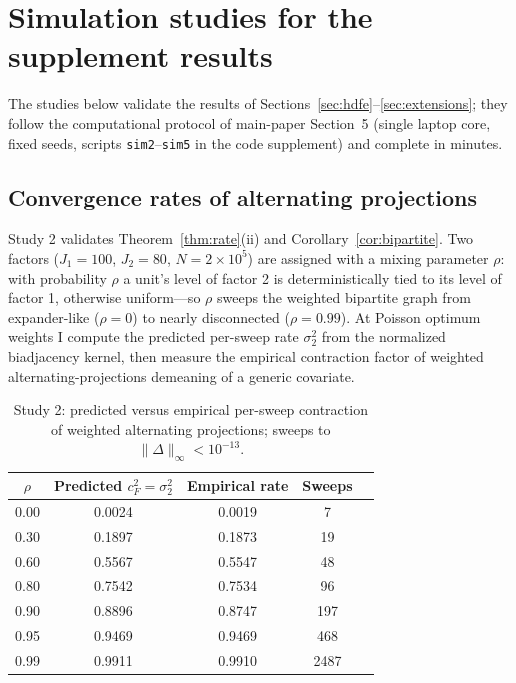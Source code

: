 \documentclass[11pt]{article}
\begin{document}
\section{Simulation studies for the supplement results}
\label{sec:supp-sims}

The studies below validate the results of
Sections~\ref{sec:hdfe}--\ref{sec:extensions}; they follow the
computational protocol of main-paper Section~5 (single laptop core,
fixed seeds, scripts \texttt{sim2}--\texttt{sim5} in the code
supplement) and complete in minutes.

\subsection{Convergence rates of alternating projections}
\label{sec:sim-rate}

Study 2 validates Theorem~\ref{thm:rate}(ii) and
Corollary~\ref{cor:bipartite}.  Two factors ($J_1 = 100$, $J_2 = 80$,
$N = 2\times10^5$) are assigned with a mixing parameter $\rho$: with
probability $\rho$ a unit's level of factor 2 is deterministically tied
to its level of factor 1, otherwise uniform---so $\rho$ sweeps the
weighted bipartite graph from expander-like ($\rho = 0$) to nearly
disconnected ($\rho = 0.99$).  At Poisson optimum weights I compute the
predicted per-sweep rate $\sigma_2^2$ from the normalized biadjacency
kernel, then measure the empirical contraction factor of weighted
alternating-projections demeaning of a generic covariate.

\begin{table}[t]
\centering
\caption{Study 2: predicted versus empirical per-sweep contraction of
weighted alternating projections; sweeps to $\|\Delta\|_\infty <
10^{-13}$.}
\label{tab:sim2}
\small
\begin{tabular}{ccccc}
\toprule
$\rho$ & Predicted $c_F^2 = \sigma_2^2$ & Empirical rate & Sweeps \\
\midrule
0.00 & 0.0024 & 0.0019 & 7 \\
0.30 & 0.1897 & 0.1873 & 19 \\
0.60 & 0.5567 & 0.5547 & 48 \\
0.80 & 0.7542 & 0.7534 & 96 \\
0.90 & 0.8896 & 0.8747 & 197 \\
0.95 & 0.9469 & 0.9469 & 468 \\
0.99 & 0.9911 & 0.9910 & 2487 \\
\bottomrule
\end{tabular}
\end{table}
\end{document}
